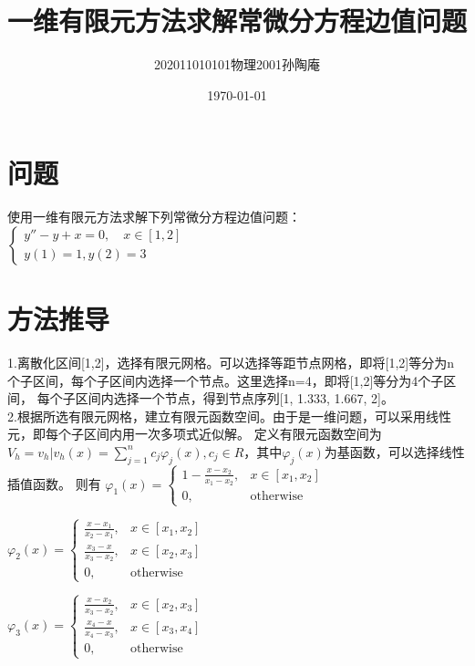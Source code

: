 \documentclass[12pt, a4paper, oneside]{ctexart}
\title{一维有限元方法求解常微分方程边值问题}
\date{\today}
\author{202011010101物理2001孙陶庵}
\begin{document}
\begin{spacing}{2.0}
\tableofcontents
\maketitle

\section{问题}
使用一维有限元方法求解下列常微分方程边值问题：
$\displaystyle \left\{\begin{matrix}y''-y+x=0,\quad x\in\left[1,2\right]\\ y\left(1\right)=1,y\left(2\right)=3\end{matrix}\right.$

\section{方法推导}
1.离散化区间[1,2]，选择有限元网格。可以选择等距节点网格，即将[1,2]等分为n个子区间，每个子区间内选择一个节点。这里选择n=4，即将[1,2]等分为4个子区间，
每个子区间内选择一个节点，得到节点序列[1, 1.333, 1.667, 2]。
\\
2.根据所选有限元网格，建立有限元函数空间。由于是一维问题，可以采用线性元，即每个子区间内用一次多项式近似解。
定义有限元函数空间为$\displaystyle V_h={v_h|v_h(x)=\sum_{j=1}^{n}c_j\varphi_j(x),c_j\in R}$，其中$\varphi_j(x)$为基函数，可以选择线性插值函数。
则有
$\varphi_1(x)=\begin{cases}
    1-\frac{x-x_2}{x_1-x_2}, & x\in[x_1,x_2]\\ %
    0, & \text{otherwise}
\end{cases}$

$\varphi_2(x)=\begin{cases}
    \frac{x-x_1}{x_2-x_1}, & x\in[x_1,x_2]\\
    \frac{x_3-x}{x_3-x_2}, & x\in[x_2,x_3]\\
    0, & \text{otherwise}
\end{cases}$

$\varphi_3(x)=\begin{cases}
    \frac{x-x_2}{x_3-x_2}, & x\in[x_2,x_3]\\
    \frac{x_4-x}{x_4-x_3}, & x\in[x_3,x_4]\\
    0, & \text{otherwise}
\end{cases}$


\end{spacing}
\end{document}
